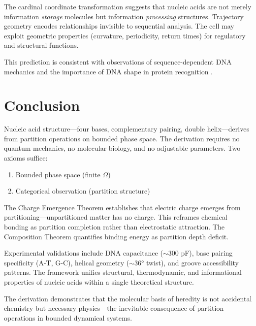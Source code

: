\documentclass[twocolumn,10pt,a4paper]{article}
\theoremstyle{definition}
\theoremstyle{remark}
\begin{document}
The cardinal coordinate transformation suggests that nucleic acids are not merely information \emph{storage} molecules but information \emph{processing} structures. Trajectory geometry encodes relationships invisible to sequential analysis. The cell may exploit geometric properties (curvature, periodicity, return times) for regulatory and structural functions.

This prediction is consistent with observations of sequence-dependent DNA mechanics \cite{rohs2009} and the importance of DNA shape in protein recognition \cite{parker2009}.

\section{Conclusion}
\label{sec:conclusion}

Nucleic acid structure---four bases, complementary pairing, double helix---derives from partition operations on bounded phase space. The derivation requires no quantum mechanics, no molecular biology, and no adjustable parameters. Two axioms suffice:

\begin{enumerate}
    \item Bounded phase space (finite $\Omega$)
    \item Categorical observation (partition structure)
\end{enumerate}

The Charge Emergence Theorem establishes that electric charge emerges from partitioning---unpartitioned matter has no charge. This reframes chemical bonding as partition completion rather than electrostatic attraction. The Composition Theorem quantifies binding energy as partition depth deficit.

Experimental validations include DNA capacitance ($\sim 300$ pF), base pairing specificity (A-T, G-C), helical geometry ($\sim 36°$ twist), and groove accessibility patterns. The framework unifies structural, thermodynamic, and informational properties of nucleic acids within a single theoretical structure.

The derivation demonstrates that the molecular basis of heredity is not accidental chemistry but necessary physics---the inevitable consequence of partition operations in bounded dynamical systems.



\end{document}
